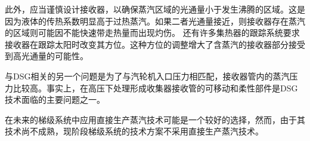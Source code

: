 此外，应当谨慎设计接收器，以确保蒸汽区域的光通量小于发生沸腾的区域。这是因为液体的传热系数明显高于过热蒸汽。如果二者光通量接近，则接收器存在蒸汽的区域则可能因不能快速带走热量而出现灼伤。
还有许多集热器的跟踪系统要求接收器在跟踪太阳时改变其方位。这种方位的调整增大了含蒸汽的接收器部分接受到高光通量的可能性。
			
与DSG相关的另一个问题是为了与汽轮机入口压力相匹配，接收器管内的蒸汽压力比较高。事实上，在高压下处理形成收集器接收管的可移动和柔性部件是DSG技术面临的主要问题之一。

在未来的梯级系统中应用直接生产蒸汽技术可能是一个较好的选择，然而，由于其技术尚不成熟，现阶段梯级系统的技术方案不采用直接生产蒸汽技术。

